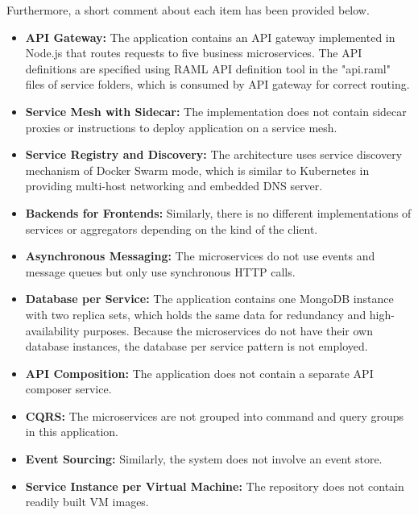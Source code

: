 \documentclass{Configuration_Files/PoliMi3i_thesis}
\begin{document}
Furthermore, a short comment about each item has been provided below.

\begin{itemize}
    \item \textbf{API Gateway:} The application contains an API gateway implemented in Node.js that routes requests to five business microservices.
    The API definitions are specified using RAML\footnotemark[101] API definition tool in the "api.raml" files of service folders, which is consumed by API gateway for correct routing.
    
    \item \textbf{Service Mesh with Sidecar:} The implementation does not contain sidecar proxies or instructions to deploy application on a service mesh.
    
    \item \textbf{Service Registry and Discovery:} The architecture uses service discovery mechanism of Docker Swarm mode, which is similar to Kubernetes in providing multi-host networking and embedded DNS server.
    
    \item \textbf{Backends for Frontends:} Similarly, there is no different implementations of services or aggregators depending on the kind of the client.
    
    \item \textbf{Asynchronous Messaging:} The microservices do not use events and message queues but only use synchronous HTTP calls.
    
    \item \textbf{Database per Service:} The application contains one MongoDB instance with two replica sets, which holds the same data for redundancy and high-availability purposes.
    Because the microservices do not have their own database instances, the database per service pattern is not employed.
    
    \item \textbf{API Composition:} The application does not contain a separate API composer service.
    
    \item \textbf{CQRS:} The microservices are not grouped into command and query groups in this application.
    
    \item \textbf{Event Sourcing:} Similarly, the system does not involve an event store.
    
    \item \textbf{Service Instance per Virtual Machine:} The repository does not contain readily built VM images.
    

\end{itemize}
\end{document}
